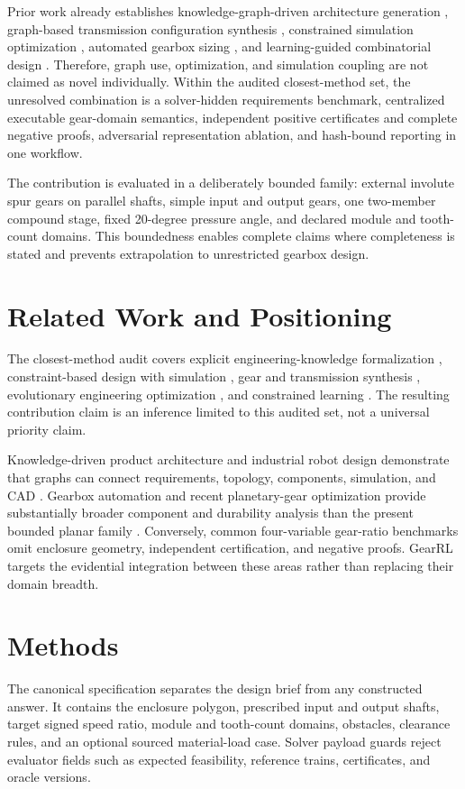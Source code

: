 \documentclass[preprint,12pt]{elsarticle}
\begin{document}
Prior work already establishes knowledge-graph-driven architecture generation \cite{huang-2025,sun-2026}, graph-based transmission configuration synthesis \cite{geng-2023}, constrained simulation optimization \cite{cicconi-2020}, automated gearbox sizing \cite{fuerst-2021}, and learning-guided combinatorial design \cite{lin-2023}. Therefore, graph use, optimization, and simulation coupling are not claimed as novel individually. Within the audited closest-method set, the unresolved combination is a solver-hidden requirements benchmark, centralized executable gear-domain semantics, independent positive certificates and complete negative proofs, adversarial representation ablation, and hash-bound reporting in one workflow.

The contribution is evaluated in a deliberately bounded family: external involute spur gears on parallel shafts, simple input and output gears, one two-member compound stage, fixed 20-degree pressure angle, and declared module and tooth-count domains. This boundedness enables complete claims where completeness is stated and prevents extrapolation to unrestricted gearbox design.

\section{Related Work and Positioning}
The closest-method audit covers explicit engineering-knowledge formalization \cite{hao-2021,bolognini-2022}, constraint-based design with simulation \cite{cicconi-2020}, gear and transmission synthesis \cite{fuerst-2021,geng-2023,kim-2026}, evolutionary engineering optimization \cite{fetanat-2023}, and constrained learning \cite{lin-2023}. The resulting contribution claim is an inference limited to this audited set, not a universal priority claim.

Knowledge-driven product architecture and industrial robot design demonstrate that graphs can connect requirements, topology, components, simulation, and CAD \cite{huang-2025,sun-2026}. Gearbox automation and recent planetary-gear optimization provide substantially broader component and durability analysis than the present bounded planar family \cite{fuerst-2021,kim-2026}. Conversely, common four-variable gear-ratio benchmarks omit enclosure geometry, independent certification, and negative proofs. GearRL targets the evidential integration between these areas rather than replacing their domain breadth.

\section{Methods}
The canonical specification separates the design brief from any constructed answer. It contains the enclosure polygon, prescribed input and output shafts, target signed speed ratio, module and tooth-count domains, obstacles, clearance rules, and an optional sourced material-load case. Solver payload guards reject evaluator fields such as expected feasibility, reference trains, certificates, and oracle versions.
\end{document}
